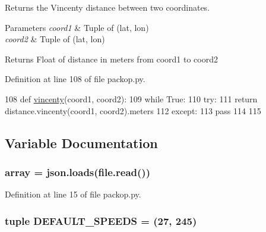 Returns the Vincenty distance between two coordinates. 


\begin{DoxyParams}{Parameters}
{\em coord1} & Tuple of (lat, lon) \\
\hline
{\em coord2} & Tuple of (lat, lon)\\
\hline
\end{DoxyParams}
\begin{DoxyReturn}{Returns}
Float of distance in meters from coord1 to coord2 
\end{DoxyReturn}


Definition at line 108 of file packop.\+py.


\begin{DoxyCode}
108 \textcolor{keyword}{def }\hyperlink{namespacesrc_1_1packop_ac16b65508182630b4ab800bffc0d06f0}{vincenty}(coord1, coord2):
109     \textcolor{keywordflow}{while} \textcolor{keyword}{True}:
110         \textcolor{keywordflow}{try}:
111             \textcolor{keywordflow}{return} distance.vincenty(coord1, coord2).meters
112         \textcolor{keywordflow}{except}:
113             \textcolor{keywordflow}{pass}
114 
115 
\end{DoxyCode}


\subsection{Variable Documentation}
\subsubsection[{\texorpdfstring{array}{array}}]{\setlength{\rightskip}{0pt plus 5cm}array = json.\+loads(file.\+read())}\hypertarget{namespacesrc_1_1packop_a41ab4b8b4e6b05e8489555b1bbc7f845}{}\label{namespacesrc_1_1packop_a41ab4b8b4e6b05e8489555b1bbc7f845}


Definition at line 15 of file packop.\+py.

\subsubsection[{\texorpdfstring{D\+E\+F\+A\+U\+L\+T\+\_\+\+S\+P\+E\+E\+DS}{DEFAULT_SPEEDS}}]{\setlength{\rightskip}{0pt plus 5cm}tuple D\+E\+F\+A\+U\+L\+T\+\_\+\+S\+P\+E\+E\+DS = (27, 245)}\hypertarget{namespacesrc_1_1packop_a21bd10200165ff80dfb55057200f8532}{}\label{namespacesrc_1_1packop_a21bd10200165ff80dfb55057200f8532}


